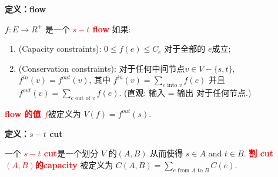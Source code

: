 \begin{figure}[H]
\end{figure}


\textbf{定义：flow}

$f: E\rightarrow R^+$ 是一个 \textcolor{red}{\bf $s-t$ flow} 如果:
\begin{enumerate}
 \item   (Capacity constraints): $0\leq f(e) \leq C_e$ 对于全部的 $e$成立;
 \item   (Conservation constraints): 对于任何中间节点$v \in V-\{s,t\}$, $f^{in}(v) = f^{out}(v)$, 其中 $f^{in}(v) = \sum_{e \text{  into } v} f(e) $ 并且 $f^{out}(v) = \sum_{ e \text{ out of } v} f(e)$. (直观: 输入 = 输出 对于任何节点.)
\end{enumerate}
 \textcolor{red}{\bf flow 的值 $f$}被定义为 $V(f) = f^{out}(s)$.


\textbf{定义：$s-t$ cut}

一个 \textcolor{red} {\bf $s-t$ cut}是一个划分 $V$ 的$(A,B)$ 从而使得 $s\in A$ and $t \in B$.
\textcolor{red}{\bf 割 cut $(A,B)$的capacity} 被定义为 $C(A,B) = \sum_{e \text{ from } A \text{ to } B} C(e)$.

